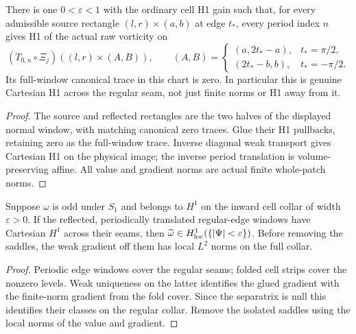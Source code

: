 \begin{lemma}
\label{lem:dd-cell-edge-h1}
\leanok
There is one $0<\varepsilon<1$ with the ordinary cell H1 gain such that,
for every admissible source rectangle $(l,r)\times(a,b)$ at edge $t_*$,
every period index $n$ gives H1 of the actual raw vorticity on
\[
 (T_{0,n}\circ\Xi_j)((l,r)\times(A,B)),
 \qquad
 (A,B)=
 \begin{cases}
  (a,2t_*-a),&t_*=\pi/2,\\
  (2t_*-b,b),&t_*=-\pi/2 .
 \end{cases}
\]
Its full-window canonical trace in this chart is zero.
In particular this is genuine Cartesian H1 across the regular seam,
not just finite norms or H1 away from it.
\end{lemma}

\begin{proof}
\leanok
The source and reflected rectangles are the two halves of the displayed
normal window, with matching canonical zero traces.
Glue their H1 pullbacks, retaining zero as the full-window trace.
Inverse diagonal weak transport gives Cartesian H1 on the physical image;
the inverse period translation is volume-preserving affine.
All value and gradient norms are actual finite whole-patch norms.
\end{proof}

\begin{lemma}
\label{lem:cell-separatrix-gluing}
\leanok
Suppose $\omega$ is odd under $S_1$ and belongs to $H^1$ on the
inward cell collar of width $\varepsilon>0$. If the reflected,
periodically translated regular-edge windows have Cartesian $H^1$
across their seams, then $\widetilde\omega\in H^1_{\rm loc}
(\{|\Psi|<\varepsilon\})$. Before removing the saddles, the weak
gradient off them has local $L^2$ norms on the full collar.
\end{lemma}

\begin{proof}
\leanok
Periodic edge windows cover the regular seams; folded cell strips cover
the nonzero levels. Weak uniqueness on the latter identifies the glued
gradient with the finite-norm gradient from the fold cover. Since the
separatrix is null this identifies their classes on the regular collar.
Remove the isolated saddles using the local norms of the value and gradient.
\end{proof}

